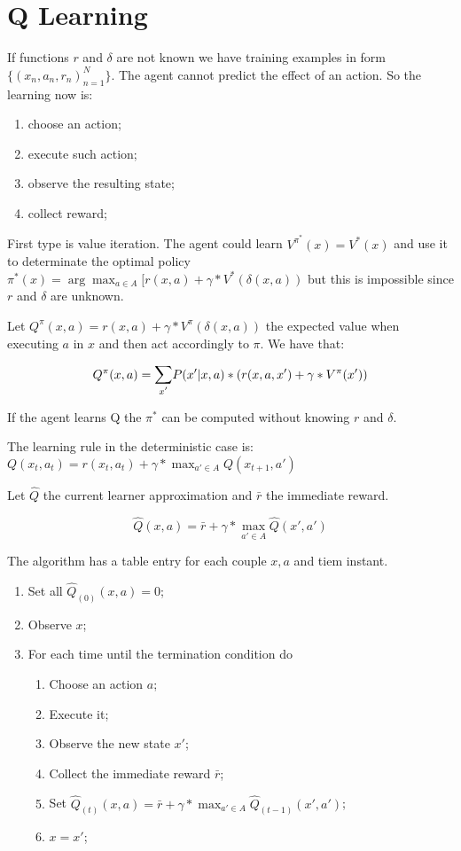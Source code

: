 \section{Q Learning}

If functions $r$ and $\delta$ are not known we have training examples in form $\{(x_n, a_n, r_n)_{n=1}^N\}$. The agent cannot predict the effect of an action. So the learning now is:

\begin{enumerate}
    \item choose an action;
    \item execute such action;
    \item observe the resulting state;
    \item collect reward;
\end{enumerate}

First type is value iteration. The agent could learn $V^{\pi^*}(x) = V^*(x)$ and use it to determinate the optimal policy $\pi^*(x) = \arg\max_{a \in A} \big[r(x,a) + \gamma*V^*(\delta(x,a))$ but this is impossible since $r$ and $\delta$ are unknown.

Let $Q^\pi(x, a) = r(x,a) + \gamma*V^\pi(\delta(x,a))$ the expected value when executing $a$ in $x$ and then act accordingly to $\pi$.
We have that:

\[
Q^\pi(x,a) = \mathlarger{\sum}_{x'} P(x' | x, a)*(r(x,a,x') + \gamma*V^\pi(x'))
\]

If the agent learns Q the $\pi^*$ can be computed without knowing $r$ and $\delta$.

The learning rule in the deterministic case is: $Q(x_t, a_t) = r(x_t, a_t) + \gamma*\max_{a' \in A} Q(x_{t+1},a')$

Let $\hat{Q}$ the current learner approximation and $\bar{r}$ the immediate reward.

\[
\hat{Q}(x, a) = \bar{r} + \gamma*\max_{a' \in A} \hat{Q}(x',a')
\]

The algorithm has a table entry for each couple $x,a$ and tiem instant.

\begin{enumerate}
    \item Set all $\hat{Q}_{(0)}(x, a) = 0$;
    \item Observe $x$;
    \item For each time until the termination condition do
        \begin{enumerate}
            \item Choose an action $a$;
            \item Execute it;
            \item Observe the new state $x'$;
            \item Collect the immediate reward $\bar{r}$;
            \item Set $\hat{Q}_{(t)}(x, a) = \bar{r} + \gamma*\max_{a' \in A} \hat{Q}_{(t-1)}(x',a')$;
            \item $x = x'$;
        \end{enumerate}
\end{enumerate}

